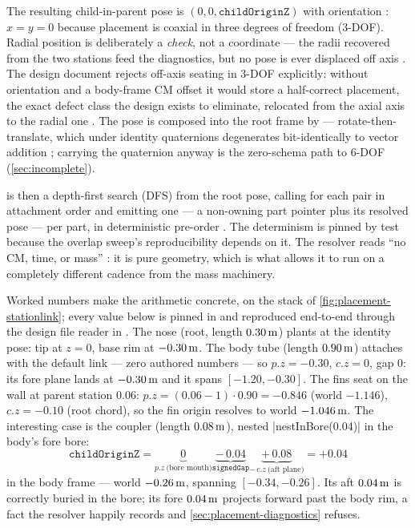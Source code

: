 The resulting child-in-parent pose is $(0, 0, \mathtt{childOriginZ})$ with orientation
: $x = y = 0$ because placement is coaxial in three degrees of freedom
(3-DOF). Radial position is deliberately a \emph{check}, not a coordinate --- the radii
recovered from the two stations feed the diagnostics, but no pose is ever displaced off
axis . The design document rejects off-axis seating in
3-DOF explicitly: without orientation and a body-frame CM offset it would store a
half-correct placement, the exact defect class the design exists to eliminate, relocated
from the axial axis to the radial one
. The pose is composed
into the root frame by  --- rotate-then-translate, which under
identity quaternions degenerates bit-identically to vector addition
; carrying the quaternion anyway is the zero-schema path
to 6-DOF (\cref{sec:incomplete}).

 is then a depth-first search (DFS) from the root pose, calling
 for each  pair in attachment order and emitting one
 --- a non-owning part pointer plus its resolved pose --- per part, in
deterministic pre-order . The determinism is pinned by
test  because the overlap sweep's
reproducibility depends on it. The resolver reads ``no CM, time, or mass''
: it is pure geometry, which is what allows it to run on
a completely different cadence from the mass machinery.

Worked numbers make the arithmetic concrete, on the  stack of
\cref{fig:placement-stationlink}; every value below is pinned in
 and reproduced end-to-end through the design
file reader in . The nose (root, length
$0.30\,\mathrm{m}$) plants at the identity pose: tip at $z=0$, base rim at $-0.30\,\mathrm{m}$. The body tube
(length $0.90\,\mathrm{m}$) attaches with the default link --- zero authored numbers --- so
$p.z=-0.30$, $c.z=0$, gap $0$: its fore plane lands at $-0.30\,\mathrm{m}$ and it spans
$[-1.20,-0.30]$. The fins seat on the wall at parent station $0.06$: $p.z =
(0.06-1)\cdot0.90 = -0.846$ (world $-1.146$), $c.z = -0.10$ (root chord), so the fin
origin resolves to world $-1.046\,\mathrm{m}$. The interesting case is the coupler (length
$0.08\,\mathrm{m}$), nested \cppinline|nestInBore(0.04)| in the body's fore bore:
\[
\mathtt{childOriginZ} = \underbrace{0}_{p.z\ \text{(bore mouth)}}
  \underbrace{-\,0.04}_{\mathtt{signedGap}}
  \underbrace{+\,0.08}_{-\,c.z\ \text{(aft plane)}} = +0.04
\]
in the body frame --- world $-0.26\,\mathrm{m}$, spanning $[-0.34, -0.26]$. Its aft $0.04\,\mathrm{m}$ is
correctly buried in the bore; its fore $0.04\,\mathrm{m}$ projects forward past the body rim, a
fact the resolver happily records and \cref{sec:placement-diagnostics} refuses.

